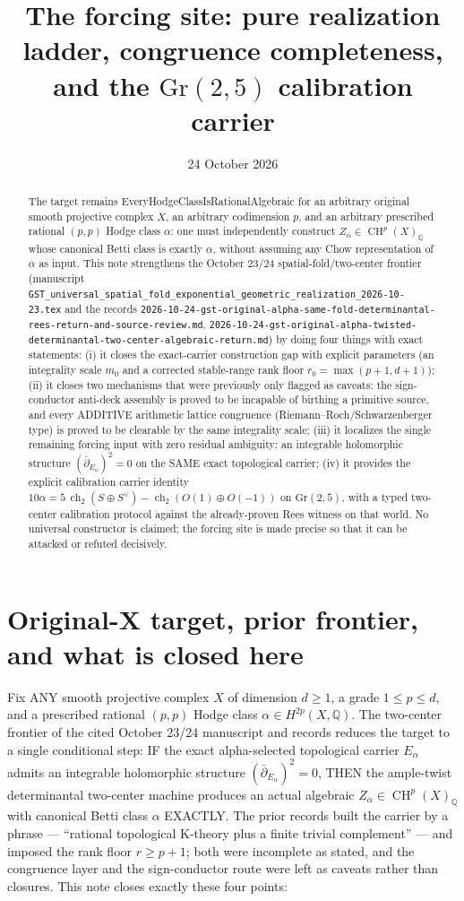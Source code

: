 \documentclass[11pt]{article}
\title{The forcing site: pure realization ladder, congruence completeness,
and the $\mathrm{Gr}(2,5)$ calibration carrier}
\date{24 October 2026}
\newcommand{\ch}{\operatorname{ch}}
\newcommand{\ddbar}{\bar\partial}
\begin{document}
\maketitle
\begin{abstract}
The target remains
EveryHodgeClassIsRationalAlgebraic for an arbitrary original smooth
projective complex $X$, an arbitrary codimension $p$, and an arbitrary
prescribed rational $(p,p)$ Hodge class $\alpha$: one must independently
construct $Z_\alpha\in \operatorname{CH}^p(X)_{\mathbb Q}$ whose canonical
Betti class is exactly $\alpha$, without assuming any Chow representation
of $\alpha$ as input. This note strengthens the October 23/24
spatial-fold/two-center frontier
(manuscript
\texttt{GST\_universal\_spatial\_fold\_exponential\_geometric\_realization\_2026-10-23.tex}
and the records
\texttt{2026-10-24-gst-original-alpha-same-fold-determinantal-rees-return-and-source-review.md},
\texttt{2026-10-24-gst-original-alpha-twisted-determinantal-two-center-algebraic-return.md})
by doing four things with exact statements:
(i) it closes the exact-carrier construction gap with explicit
parameters (an integrality scale $m_0$ and a corrected stable-range rank
floor $r_0=\max(p+1,d+1)$);
(ii) it closes two mechanisms that were previously only flagged as
caveats: the sign-conductor anti-deck assembly is proved to be
incapable of birthing a primitive source, and every ADDITIVE
arithmetic lattice congruence (Riemann--Roch/Schwarzenberger type)
is proved to be clearable by the same integrality scale;
(iii) it localizes the single remaining forcing input with zero
residual ambiguity: an integrable holomorphic structure
$(\ddbar_{E_\alpha})^2=0$ on the SAME exact topological carrier;
(iv) it provides the explicit calibration carrier identity
$10\alpha=5\,\ch_2(S\oplus S^\vee)-\ch_2(O(1)\oplus O(-1))$ on
$\mathrm{Gr}(2,5)$, with a typed two-center calibration protocol against
the already-proven Rees witness on that world.
No universal constructor is claimed; the forcing site is made precise
so that it can be attacked or refuted decisively.
\end{abstract}

\section{Original-X target, prior frontier, and what is closed here}
Fix ANY smooth projective complex $X$ of dimension $d\ge 1$, a grade
$1\le p\le d$, and a prescribed rational $(p,p)$ Hodge class
$\alpha\in H^{2p}(X,\mathbb Q)$. The two-center frontier of the cited
October 23/24 manuscript and records reduces the target to a single
conditional step: IF the exact alpha-selected topological carrier
$E_\alpha$ admits an integrable holomorphic structure
$(\ddbar_{E_\alpha})^2=0$, THEN the ample-twist determinantal two-center
machine produces an actual algebraic $Z_\alpha\in\operatorname{CH}^p(X)_{\mathbb Q}$
with canonical Betti class $\alpha$ EXACTLY.
The prior records built the carrier by a phrase --- ``rational
topological K-theory plus a finite trivial complement'' --- and imposed
the rank floor $r\ge p+1$; both were incomplete as stated, and the
congruence layer and the sign-conductor route were left as caveats
rather than closures. This note closes exactly these four points:
\end{document}
